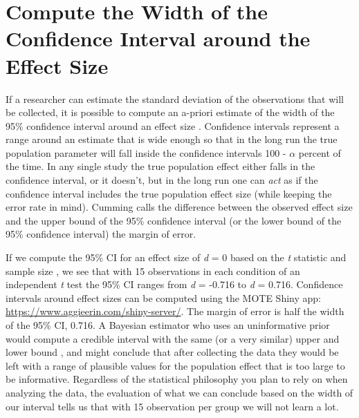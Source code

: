 \documentclass[
  oneside]{book}
\begin{document}
\hypertarget{compute-the-width-of-the-confidence-interval-around-the-effect-size}{%
\section{Compute the Width of the Confidence Interval around the Effect Size}\label{compute-the-width-of-the-confidence-interval-around-the-effect-size}}

If a researcher can estimate the standard deviation of the observations that will be collected, it is possible to compute an a-priori estimate of the width of the 95\% confidence interval around an effect size \citep{kelley_confidence_2007}. Confidence intervals represent a range around an estimate that is wide enough so that in the long run the true population parameter will fall inside the confidence intervals 100 - \(\alpha\) percent of the time. In any single study the true population effect either falls in the confidence interval, or it doesn't, but in the long run one can \emph{act} as if the confidence interval includes the true population effect size (while keeping the error rate in mind). Cumming \citeyearpar{cumming_understanding_2013} calls the difference between the observed effect size and the upper bound of the 95\% confidence interval (or the lower bound of the 95\% confidence interval) the margin of error.

If we compute the 95\% CI for an effect size of \emph{d} = 0 based on the \emph{t} statistic and sample size \citep{smithson_confidence_2003}, we see that with 15 observations in each condition of an independent \emph{t} test the 95\% CI ranges from \emph{d} = -0.716 to \emph{d} = 0.716. Confidence intervals around effect sizes can be computed using the MOTE Shiny app: \url{https://www.aggieerin.com/shiny-server/}. The margin of error is half the width of the 95\% CI, 0.716. A Bayesian estimator who uses an uninformative prior would compute a credible interval with the same (or a very similar) upper and lower bound \citep{albers_credible_2018, kruschke_bayesian_2011}, and might conclude that after collecting the data they would be left with a range of plausible values for the population effect that is too large to be informative. Regardless of the statistical philosophy you plan to rely on when analyzing the data, the evaluation of what we can conclude based on the width of our interval tells us that with 15 observation per group we will not learn a lot.
\end{document}

